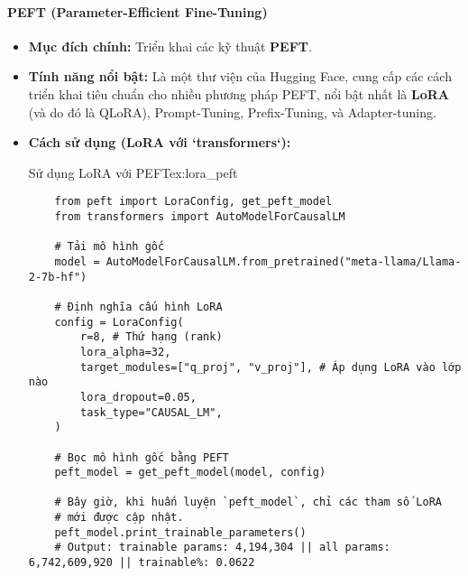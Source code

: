 \paragraph{PEFT (Parameter-Efficient Fine-Tuning)}
\begin{itemize}
    \item \textbf{Mục đích chính:} Triển khai các kỹ thuật \textbf{PEFT}.
    \item \textbf{Tính năng nổi bật:} Là một thư viện của Hugging Face, cung cấp các cách triển khai tiêu chuẩn cho nhiều phương pháp PEFT, nổi bật nhất là \textbf{LoRA} (và do đó là QLoRA), Prompt-Tuning, Prefix-Tuning, và Adapter-tuning.
    \item \textbf{Cách sử dụng (LoRA với `transformers`):}
    \begin{example}{Sử dụng LoRA với PEFT}{ex:lora_peft}
    \begin{verbatim}
    from peft import LoraConfig, get_peft_model
    from transformers import AutoModelForCausalLM

    # Tải mô hình gốc
    model = AutoModelForCausalLM.from_pretrained("meta-llama/Llama-2-7b-hf")

    # Định nghĩa cấu hình LoRA
    config = LoraConfig(
        r=8, # Thứ hạng (rank)
        lora_alpha=32,
        target_modules=["q_proj", "v_proj"], # Áp dụng LoRA vào lớp nào
        lora_dropout=0.05,
        task_type="CAUSAL_LM",
    )

    # Bọc mô hình gốc bằng PEFT
    peft_model = get_peft_model(model, config)

    # Bây giờ, khi huấn luyện `peft_model`, chỉ các tham số LoRA
    # mới được cập nhật.
    peft_model.print_trainable_parameters()
    # Output: trainable params: 4,194,304 || all params: 6,742,609,920 || trainable%: 0.0622
    \end{verbatim}
    \end{example}
\end{itemize}

